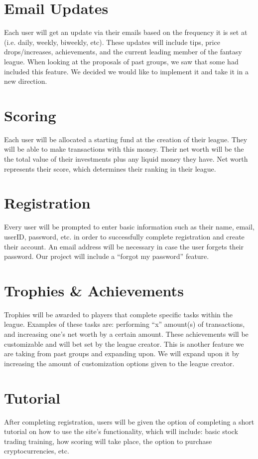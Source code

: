 \documentclass[11pt,letterpaper,oneside]{memoir}
\begin{document}
\section{Email Updates}
Each user will get an update via their emails based on the frequency it is set at (i.e. daily, weekly, biweekly, etc). These updates will include tips, price drops/increases, achievements, and the current leading member of the fantasy league. When looking at the proposals of past groups, we saw that some had included this feature. We decided we would like to implement it and take it in a new direction.

\section{Scoring}
Each user will be allocated a starting fund at the creation of their league. They will be able to make transactions with this money. Their net worth will be the the total value of their investments plus any liquid money they have. Net worth represents their score, which determines their ranking in their league.

\section{Registration}
Every user will be prompted to enter basic information such as their name, email, userID, password, etc. in order to successfully complete registration and create their account. An email address will be necessary in case the user forgets their password. Our project will include a “forgot my password” feature. 
 
\section{Trophies \& Achievements}
Trophies will be awarded to players that complete specific tasks within the league. Examples of these tasks are: performing “x” amount(s) of transactions, and  increasing one’s net worth by a certain amount. These achievements will be customizable and will bet set by the league creator. This is another feature we are taking from past groups and expanding upon. We will expand upon it by increasing the amount of customization options given to the league creator.

\section{Tutorial}
After completing registration, users will be given the option of completing  a short tutorial on how to use the site’s functionality, which will include: basic stock trading training, how scoring will take place, the option to purchase cryptocurrencies, etc.  
\end{document}
